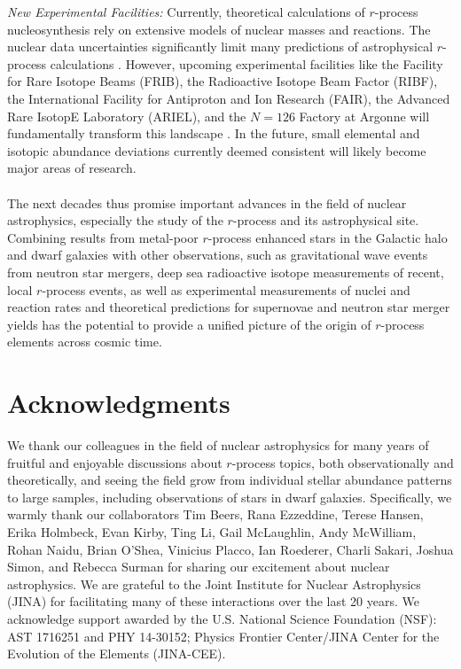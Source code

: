 \documentclass[letterpaper]{article}
\begin{document}
\textit{New Experimental Facilities:} Currently, theoretical calculations of $r$-process nucleosynthesis rely on extensive models of nuclear masses and reactions. The nuclear data uncertainties significantly limit many predictions of astrophysical $r$-process calculations \citep[e.g.,][]{Eichler2015,Mendoza-Temis2015,Mumpower2016,Surman2017,Barnes2021}.
However, upcoming experimental facilities like the Facility for Rare Isotope Beams (FRIB), the Radioactive Isotope Beam Factor (RIBF), the International Facility for Antiproton and Ion Research (FAIR), the Advanced Rare IsotopE Laboratory (ARIEL), and the $N=126$ Factory at Argonne will fundamentally transform this landscape \citep{Horowitz2019}. In the future, small elemental and isotopic abundance deviations currently deemed consistent will likely become major areas of research.
\\\\


The next decades thus promise important advances in the field of nuclear astrophysics, especially the study of the $r$-process and its astrophysical site. 
Combining results from metal-poor $r$-process enhanced stars in the Galactic halo and dwarf galaxies with other observations, such as gravitational wave events from neutron star mergers, deep sea radioactive isotope measurements of recent, local $r$-process events, as well as experimental measurements of nuclei and reaction rates and theoretical predictions for supernovae and neutron star merger yields has the potential to provide a unified picture of the origin of $r$-process elements across cosmic time. 


\section*{Acknowledgments}
We thank our colleagues in the field of nuclear astrophysics for many years of fruitful and enjoyable discussions about $r$-process topics, both observationally and theoretically, and seeing the field grow from individual stellar abundance patterns to large samples, including observations of stars in dwarf galaxies. 
Specifically, we warmly thank our collaborators
Tim Beers,
Rana Ezzeddine,
Terese Hansen,
Erika Holmbeck,
Evan Kirby,
Ting Li,
Gail McLaughlin,
Andy McWilliam,
Rohan Naidu,
Brian O'Shea,
Vinicius Placco,
Ian Roederer,
Charli Sakari,
Joshua Simon,
and
Rebecca Surman
for sharing our excitement about nuclear astrophysics. 
We are grateful to the Joint Institute for Nuclear Astrophysics (JINA) for facilitating many of these interactions over the last 20 years.
We acknowledge support awarded by the U.S. National Science Foundation (NSF): AST 1716251 and PHY 14-30152; Physics Frontier Center/JINA Center for the
Evolution of the Elements (JINA-CEE).
\end{document}
